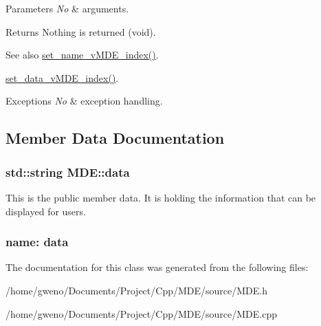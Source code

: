 \begin{DoxyParams}{Parameters}
{\em No} & arguments. \\
\hline
\end{DoxyParams}
\begin{DoxyReturn}{Returns}
Nothing is returned (void). 
\end{DoxyReturn}
\begin{DoxySeeAlso}{See also}
\hyperlink{group__group__set_gaa140f8ec04b385dad147e8d4defc8434}{set\+\_\+name\+\_\+v\+M\+D\+E\+\_\+index()}. 

\hyperlink{group__group__set_ga5dee98068559783970fd355f7183add7}{set\+\_\+data\+\_\+v\+M\+D\+E\+\_\+index()}. 
\end{DoxySeeAlso}

\begin{DoxyExceptions}{Exceptions}
{\em No} & exception handling. \\
\hline
\end{DoxyExceptions}


\subsection{Member Data Documentation}
\subsubsection[{\texorpdfstring{data}{data}}]{\setlength{\rightskip}{0pt plus 5cm}std\+::string M\+D\+E\+::data}\hypertarget{classMDE_a4b1eec75c370b8906e7b203bfb231308}{}\label{classMDE_a4b1eec75c370b8906e7b203bfb231308}


This is the public member \textquotesingle{}data\textquotesingle{}. It is holding the information that can be displayed for users. 

\subsubsection*{name\+: data}

The documentation for this class was generated from the following files\+:\begin{DoxyCompactItemize}
\item 
/home/gweno/\+Documents/\+Project/\+Cpp/\+M\+D\+E/source/M\+D\+E.\+h\item 
/home/gweno/\+Documents/\+Project/\+Cpp/\+M\+D\+E/source/M\+D\+E.\+cpp\end{DoxyCompactItemize}

